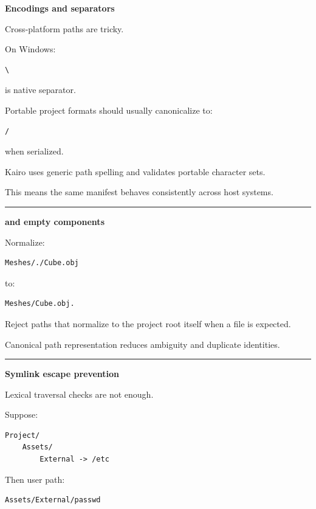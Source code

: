 \textbf{Encodings and separators}

Cross-platform paths are tricky.

On Windows:

\begin{verbatim}
\
\end{verbatim}

is native separator.

Portable project formats should usually canonicalize to:

\begin{verbatim}
/
\end{verbatim}

when serialized.

Kairo uses generic path spelling and validates portable character sets.

This means the same manifest behaves consistently across host systems.

\begin{center}\rule{0.5\linewidth}{0.5pt}\end{center}

\textbf{ and empty components}

Normalize:

\begin{verbatim}
Meshes/./Cube.obj
\end{verbatim}

to:

\begin{verbatim}
Meshes/Cube.obj.
\end{verbatim}

Reject paths that normalize to the project root itself when a file is expected.

Canonical path representation reduces ambiguity and duplicate identities.

\begin{center}\rule{0.5\linewidth}{0.5pt}\end{center}

\textbf{Symlink escape prevention}

Lexical traversal checks are not enough.

Suppose:

\begin{verbatim}
Project/
    Assets/
        External -> /etc
\end{verbatim}

Then user path:

\begin{verbatim}
Assets/External/passwd
\end{verbatim}

